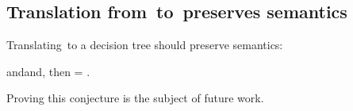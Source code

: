 \documentclass[manuscript,screen, 12pt, nonacm]{acmart}
\begin{document}
\rawcompiler

    \subsection{Translation from~\VMinus to~\D preserves semantics}
    
    Translating~\iffibf to a decision tree should preserve semantics:
    \begin{conjecture}
      \vmeval[result={\result[1]}]\;and\;\compilebig[iffi=\expr,
      compiled=\expr']\;and\;\vmeval[exp=\expr', result={\result[2]}], then
      {\result[1]} = {\result[2]}. 
    \end{conjecture}
    Proving this conjecture is the subject of future work. 
\end{document}
